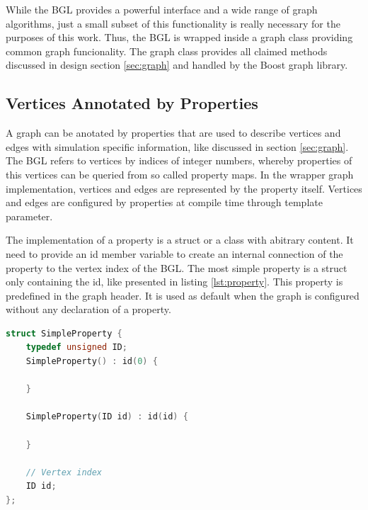 While the BGL provides a powerful interface and a wide range of graph
algorithms, just a small subset of this functionality is really
necessary for the purposes of this work. Thus, the BGL is wrapped
inside a graph class providing common graph funcionality.  The
graph class provides all claimed methods discussed in design section
\ref{sec:graph} and handled by the Boost graph library.


\subsection{Vertices Annotated by Properties}

A graph can be anotated by properties that are used to describe
vertices and edges with simulation specific information, like
discussed in section \ref{sec:graph}. The BGL refers to vertices by
indices of integer numbers, whereby properties of this vertices can be
queried from so called property maps. In the wrapper graph implementation,
vertices and edges are represented by the property itself. Vertices
and edges are configured by properties at compile time through
template parameter.

The implementation of a property is a struct or a class with abitrary content. It need
to provide an id member variable to create an internal connection of
the property to the vertex index of the BGL.  The most simple property
is a struct only containing the id, like presented in listing
\ref{lst:property}. This property is predefined in the graph
header. It is used as default when the graph is configured without any
declaration of a property.

\begin{lstlisting}[language=C++, label=lst:property]
struct SimpleProperty {
    typedef unsigned ID;
    SimpleProperty() : id(0) {

    }
    
    SimpleProperty(ID id) : id(id) {

    }

    // Vertex index
    ID id;
};
\end{lstlisting}

